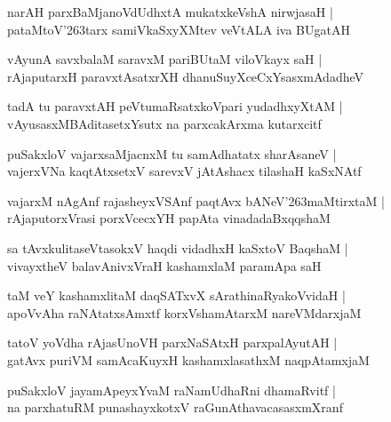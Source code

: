 \documentclass[twoside,12pt,openright]{book}
\def\S{\char'263}
\newcounter{shloka}[chapter]
\begin{document}
\begin{shloka}%
narAH parxBaMjanoVdUdhxtA mukatxkeVshA nirwjasaH |\\
pataMtoV\S tarx samiVkaSxyXMtev veVtALA iva BUgatAH
\end{shloka}

\begin{shloka}%
vAyunA savxbalaM saravxM pariBUtaM viloVkayx saH |\\
rAjaputarxH paravxtAsatxrXH dhanuSuyXceCxYsasxmAdadheV
\end{shloka}

\begin{shloka}%
tadA tu paravxtAH peVtumaRsatxkoVpari yudadhxyXtAM |\\
vAyusasxMBAditasetxYsutx na parxcakArxma kutarxcitf 
\end{shloka}

\begin{shloka}%
puSakxloV vajarxsaMjacnxM tu samAdhatatx sharAsaneV |\\
vajerxVNa kaqtAtxsetxV sarevxV jAtAshacx tilashaH kaSxNAtf 
\end{shloka}

\begin{shloka}%
vajarxM nAgAnf rajasheyxVSAnf paqtAvx bANeV\S maMtirxtaM |\\
rAjaputorxVrasi porxVcecxYH papAta vinadadaBxqqshaM 
\end{shloka}

\begin{shloka}%
sa tAvxkulitaseVtasokxV haqdi vidadhxH kaSxtoV BaqshaM |\\
vivayxtheV balavAnivxVraH kashamxlaM  paramApa saH 
\end{shloka}

\begin{shloka}%
taM veY kashamxlitaM daqSATxvX sArathinaRyakoVvidaH |\\
apoVvAha raNAtatxsAmxtf korxVshamAtarxM nareVMdarxjaM 
\end{shloka}

\begin{shloka}%
tatoV yoVdha rAjasUnoVH parxNaSAtxH parxpalAyutAH |\\
gatAvx puriVM samAcaKuyxH kashamxlasathxM naqpAtamxjaM 
\end{shloka}

\begin{shloka}%
puSakxloV jayamApeyxYvaM raNamUdhaRni dhamaRvitf |\\
na parxhatuRM punashayxkotxV raGunAthavacasasxmXranf
\end{shloka}
\end{document}
